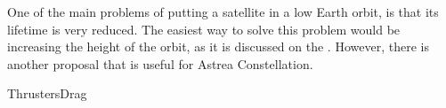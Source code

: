 
One of the main problems of putting a satellite in a low Earth orbit, is that its lifetime is very reduced. The easiest way to solve this problem would be increasing the height of the orbit, as it is discussed on the \cite[Chapter 4, Section 3]{annex1}. However, there is another proposal that is useful for Astrea Constellation.

{ThrustersDrag}